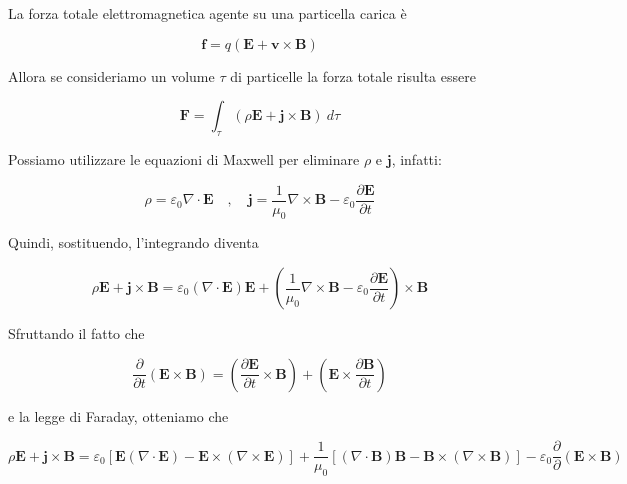 La forza totale elettromagnetica agente su una particella carica è 

\begin{equation}
    \mathbf{f} = q (\mathbf{E} + \mathbf{v} \times \mathbf{B})
\end{equation}

Allora se consideriamo un volume $\tau$ di particelle la forza totale risulta essere 

\begin{equation}
    \mathbf{F} = \int_{\tau} (\rho \mathbf{E} + \mathbf{j} \times \mathbf{B}) \ d\tau
\end{equation}

Possiamo utilizzare le equazioni di Maxwell per eliminare $\rho$ e $\mathbf{j}$, infatti:

\begin{equation}
    \rho = \varepsilon_0 \nabla \cdot \mathbf{E} \quad , \quad \mathbf{j} = \frac{1}{\mu_0} \nabla \times \mathbf{B} - \varepsilon_0 \frac{\partial \mathbf{E}}{\partial t}
\end{equation}

Quindi, sostituendo, l'integrando diventa 

\begin{equation}
    \rho \mathbf{E} + \mathbf{j} \times \mathbf{B} = \varepsilon_0 (\nabla \cdot \mathbf{E}) \mathbf{E} + \left( \frac{1}{\mu_0} \nabla \times \mathbf{B} - \varepsilon_0 \frac{\partial \mathbf{E}}{\partial t} \right) \times \mathbf{B}
\end{equation}

Sfruttando il fatto che 

\begin{equation*}
    \frac{\partial}{\partial t} (\mathbf{E} \times \mathbf{B}) =  \left( \frac{\partial \mathbf{E}}{\partial t} \times \mathbf{B} \right) + \left( \mathbf{E} \times \frac{\partial \mathbf{B}}{\partial t} \right)
\end{equation*}

e la legge di Faraday, otteniamo che 

\begin{equation}
    \rho \mathbf{E} + \mathbf{j} \times \mathbf{B} = \varepsilon_0 [\mathbf{E}(\nabla \cdot \mathbf{E}) - \mathbf{E} \times (\nabla \times \mathbf{E})] + \frac{1}{\mu_0}[(\nabla \cdot \mathbf{B})\mathbf{B} - \mathbf{B} \times (\nabla \times \mathbf{B})] - \varepsilon_0 \frac{\partial}{\partial} (\mathbf{E} \times \mathbf{B})
\end{equation}

